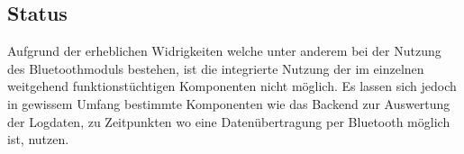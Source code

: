 \documentclass[12pt,a4paper]{article}
\begin{document}
\subsection{Status}
Aufgrund der erheblichen Widrigkeiten welche unter anderem bei der Nutzung des Bluetoothmoduls bestehen, ist die integrierte Nutzung der im einzelnen weitgehend funktionstüchtigen Komponenten nicht möglich. Es lassen sich jedoch in gewissem Umfang bestimmte Komponenten wie das Backend zur Auswertung der Logdaten, zu Zeitpunkten wo eine Datenübertragung per Bluetooth möglich ist, nutzen.
\end{document}
